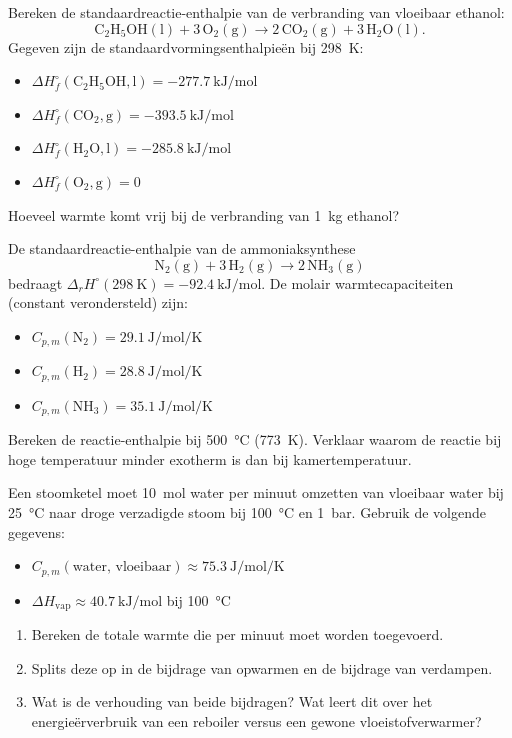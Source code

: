 \begin{oefening}
Bereken de standaardreactie-enthalpie van de verbranding van vloeibaar ethanol:
\[
\mathrm{C_2H_5OH(l) + 3\,O_2(g) \rightarrow 2\,CO_2(g) + 3\,H_2O(l)}.
\]
Gegeven zijn de standaardvormingsenthalpie\"en bij \SI{298}{\kelvin}:
\begin{itemize}
\item $\Delta H_f^\circ(\mathrm{C_2H_5OH,l}) = \SI{-277.7}{\kilo\joule\per\mole}$
\item $\Delta H_f^\circ(\mathrm{CO_2,g}) = \SI{-393.5}{\kilo\joule\per\mole}$
\item $\Delta H_f^\circ(\mathrm{H_2O,l}) = \SI{-285.8}{\kilo\joule\per\mole}$
\item $\Delta H_f^\circ(\mathrm{O_2,g}) = 0$
\end{itemize}
Hoeveel warmte komt vrij bij de verbranding van \SI{1}{\kilogram} ethanol?    
\end{oefening}

\begin{oefening}
De standaardreactie-enthalpie van de ammoniaksynthese
\[
\mathrm{N_2(g) + 3\,H_2(g) \rightarrow 2\,NH_3(g)}
\]
bedraagt $\Delta_r H^\circ(\SI{298}{\kelvin}) = \SI{-92.4}{\kilo\joule\per\mole}$. De molair warmtecapaciteiten (constant verondersteld) zijn:
\begin{itemize}
\item $C_{p,m}(\mathrm{N_2}) = \SI{29.1}{\joule\per\mole\per\kelvin}$
\item $C_{p,m}(\mathrm{H_2}) = \SI{28.8}{\joule\per\mole\per\kelvin}$
\item $C_{p,m}(\mathrm{NH_3}) = \SI{35.1}{\joule\per\mole\per\kelvin}$
\end{itemize}
Bereken de reactie-enthalpie bij \SI{500}{\celsius} (\SI{773}{\kelvin}). Verklaar waarom de reactie bij hoge temperatuur minder exotherm is dan bij kamertemperatuur.    
\end{oefening}
    
\begin{oefening}
Een stoomketel moet \SI{10}{\mole} water per minuut omzetten van vloeibaar water bij \SI{25}{\celsius} naar droge verzadigde stoom bij \SI{100}{\celsius} en \SI{1}{\bar}. Gebruik de volgende gegevens:
\begin{itemize}
\item $C_{p,m}(\text{water, vloeibaar}) \approx \SI{75.3}{\joule\per\mole\per\kelvin}$
\item $\Delta H_{\text{vap}} \approx \SI{40.7}{\kilo\joule\per\mole}$ bij \SI{100}{\celsius}
\end{itemize}
\begin{enumerate}
\item[(a)] Bereken de totale warmte die per minuut moet worden toegevoerd.
\item[(b)] Splits deze op in de bijdrage van opwarmen en de bijdrage van verdampen.
\item[(c)] Wat is de verhouding van beide bijdragen? Wat leert dit over het energie\"erverbruik van een reboiler versus een gewone vloeistofverwarmer?
\end{enumerate}    
\end{oefening}

